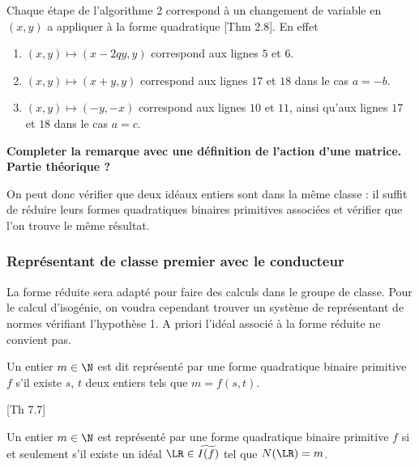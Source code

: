 \begin{Rem}
	Chaque étape de l'algorithme 2 correspond à un changement de variable en $(x,y)$ a appliquer à la forme quadratique \cite{Cox}[Thm 2.8]. En effet
	\begin{enumerate}
		\item $(x,y)\mapsto (x - 2qy, y)$ correspond aux lignes $5$ et $6$.
		\item $(x,y)\mapsto (x + y, y)$ correspond aux lignes $17$ et $18$ dans le cas $a = -b$.
		\item $(x,y)\mapsto(-y,-x)$ correspond aux lignes $10$ et $11$, ainsi qu'aux lignes $17$ et $18$ dans le cas $a = c$. 
	\end{enumerate}
	
	\textbf{Completer la remarque avec une définition de l'action d'une matrice. Partie théorique ?}
	
\end{Rem}

\begin{Rem}
	On peut donc vérifier que deux idéaux entiers sont dans la même classe : il suffit de réduire leurs formes quadratiques binaires primitives associées et vérifier que l'on trouve le même résultat. 
\end{Rem}






\subsubsection{Représentant de classe premier avec le conducteur}

La forme réduite sera adapté pour faire des calculs dans le groupe de classe. Pour le calcul d'isogénie, on voudra cependant trouver un système de représentant de normes vérifiant l'hypothèse 1. A priori l'idéal associé à la forme réduite ne convient pas. 

\begin{Def}
	Un entier $m\in\N$ est dit représenté par une forme quadratique binaire primitive $f$ s'il existe $s$, $t$ deux entiers tels que $m = f(s,t)$.
\end{Def}

\begin{Prop}\cite{Cox}[Th 7.7]
	
	Un entier $m\in\N$ est représenté par une forme quadratique binaire primitive $f$ si et seulement s'il existe un idéal $\LR\in \widetilde{I(f)}$ tel que $N(\LR) = m$.
\end{Prop}

